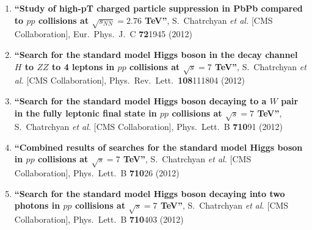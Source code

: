 \begin{enumerate}
\item%
{\bf ``Study of high-pT charged particle suppression in PbPb compared to $pp$ collisions at $\sqrt{s_{NN}}=2.76$ TeV''}, 
  S.~Chatrchyan {\it et al.}  [CMS Collaboration], 
Eur.\ Phys.\ J.\ C {\bf 72}1945 (2012) %


\item%
{\bf ``Search for the standard model Higgs boson in the decay channel $H$ to $Z Z$ to 4 leptons in $pp$ collisions at $\sqrt{s}=7$ TeV''}, 
  S.~Chatrchyan {\it et al.}  [CMS Collaboration], 
Phys.\ Rev.\ Lett.\  {\bf 108}111804 (2012) %


\item%
{\bf ``Search for the standard model Higgs boson decaying to a $W$ pair in the fully leptonic final state in $pp$ collisions at $\sqrt{s}=7$ TeV''}, 
  S.~Chatrchyan {\it et al.}  [CMS Collaboration], 
Phys.\ Lett.\ B {\bf 710}91 (2012) %


\item%
{\bf ``Combined results of searches for the standard model Higgs boson in $pp$ collisions at $\sqrt{s}=7$ TeV''}, 
  S.~Chatrchyan {\it et al.}  [CMS Collaboration], 
Phys.\ Lett.\ B {\bf 710}26 (2012) %


\item%
{\bf ``Search for the standard model Higgs boson decaying into two photons in $pp$ collisions at $\sqrt{s}=7$ TeV''}, 
  S.~Chatrchyan {\it et al.}  [CMS Collaboration], 
Phys.\ Lett.\ B {\bf 710}403 (2012) %



\end{enumerate}
